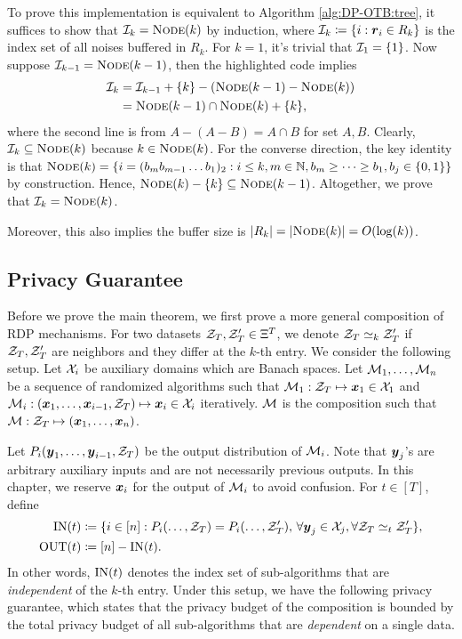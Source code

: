 To prove this implementation is equivalent to Algorithm \ref{alg:DP-OTB:tree}, it suffices to show that ${\cal I}_k={\normalfont\textsc{Node}}(k)$ by induction, where ${\cal I}_k\coloneqq\{i:{\boldsymbol{r}}_i\in R_k\}$ is the index set of all noises buffered in $R_k$. For $k=1$, it's trivial that ${\cal I}_1=\{1\}$. Now suppose ${\cal I}_{k-1}={\normalfont\textsc{Node}}(k-1)$, then the highlighted code implies
\begin{align}
    {\cal I}_k 
    &= {\cal I}_{k-1} + \{k\} - ({\normalfont\textsc{Node}}(k-1) - {\normalfont\textsc{Node}}(k)) \notag\\
    &= {\normalfont\textsc{Node}}(k-1) \cap {\normalfont\textsc{Node}}(k) + \{k\},
    \label{eq:app:tree-mechanism:1}
\end{align}
where the second line is from $A-(A-B)=A\cap B$ for set $A,B$.
Clearly, ${\cal I}_k\subseteq {\normalfont\textsc{Node}}(k)$ because $k\in{\normalfont\textsc{Node}}(k)$. For the converse direction, the key identity is that ${\normalfont\textsc{Node}}(k) = \{i=(b_m b_{m-1} \ldots b_1)_2 : i\le k, m\in\mathbb N, b_m \ge \cdots \ge b_1, b_j\in\{0,1\}\}$ by construction. Hence, ${\normalfont\textsc{Node}}(k)-\{k\} \subseteq {\normalfont\textsc{Node}}(k-1)$.
Altogether, we prove that ${\cal I}_k={\normalfont\textsc{Node}}(k)$.

Moreover, this also implies the buffer size is $|R_k| = |{\normalfont\textsc{Node}}(k)| = O(\log(k))$.


\subsection{Privacy Guarantee}
\label{app:prelim:tree-mechanism:privacy}

Before we prove the main theorem, we first prove a more general composition of RDP mechanisms. For two datasets ${\cal Z}_T,{\cal Z}_T'\in\Xi^T$, we denote ${\cal Z}_T\simeq_k {\cal Z}_T'$ if ${\cal Z}_T,{\cal Z}_T'$ are neighbors and they differ at the $k$-th entry. We consider the following setup. Let ${\cal X}_i$ be auxiliary domains which are Banach spaces. Let ${\cal M}_1,\ldots,{\cal M}_n$ be a sequence of randomized algorithms such that ${\cal M}_1:{\cal Z}_T\mapsto {\boldsymbol{x}}_1\in{\cal X}_1$ and ${\cal M}_i:({\boldsymbol{x}}_1,\ldots,{\boldsymbol{x}}_{i-1},{\cal Z}_T)\mapsto {\boldsymbol{x}}_i\in{\cal X}_i$ iteratively. ${\cal M}$ is the composition such that ${\cal M}:{\cal Z}_T\mapsto ({\boldsymbol{x}}_1,\ldots,{\boldsymbol{x}}_n)$.

Let $P_i({\boldsymbol{y}}_1,\ldots,{\boldsymbol{y}}_{i-1},{\cal Z}_T)$ be the output distribution of ${\cal M}_i$. Note that ${\boldsymbol{y}}_j$'s are arbitrary auxiliary inputs and are not necessarily previous outputs. In this chapter, we reserve ${\boldsymbol{x}}_i$ for the output of ${\cal M}_i$ to avoid confusion. For $t\in[T]$, define
\begin{align*}
    \mathrm{IN}(t) &\coloneqq \{ i\in[n] : P_i(\ldots,{\cal Z}_T) = P_i(\ldots,{\cal Z}_T'), \, \forall {\boldsymbol{y}}_j\in{\cal X}_j, \forall {\cal Z}_T\simeq_t {\cal Z}_T' \}, \\
    \mathrm{OUT}(t) &\coloneqq [n]-\mathrm{IN}(t).
\end{align*} 
In other words, $\mathrm{IN}(t)$ denotes the index set of sub-algorithms that are \emph{independent} of the $k$-th entry. Under this setup, we have the following privacy guarantee, which states that the privacy budget of the composition is bounded by the total privacy budget of all sub-algorithms that are \emph{dependent} on a single data.

